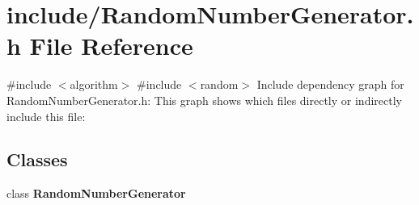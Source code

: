 \section{include/\+Random\+Number\+Generator.h File Reference}
\label{_random_number_generator_8h}
{\ttfamily \#include $<$algorithm$>$}\newline
{\ttfamily \#include $<$random$>$}\newline
Include dependency graph for Random\+Number\+Generator.\+h\+:
This graph shows which files directly or indirectly include this file\+:
\subsection*{Classes}
\begin{DoxyCompactItemize}
\item 
class \textbf{ Random\+Number\+Generator}
\end{DoxyCompactItemize}
